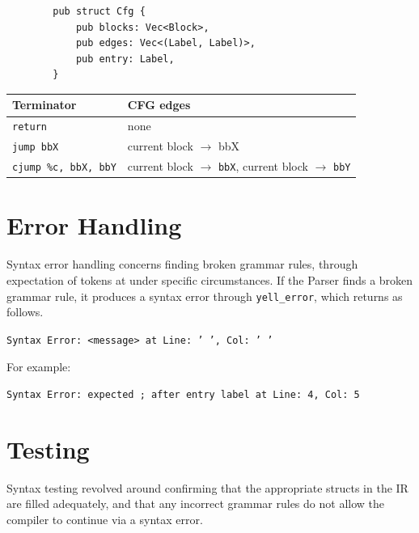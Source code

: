 \documentclass[11pt,a4paper,oneside]{report}
\begin{document}
	\begin{lstlisting}
		pub struct Cfg {
			pub blocks: Vec<Block>,
			pub edges: Vec<(Label, Label)>,
			pub entry: Label,
		}
	\end{lstlisting}
	
	\begin{center}
		\begin{tabular}{ll}
			\toprule
			Terminator & CFG edges \\
			\midrule
			\texttt{return} & none \\
			\texttt{jump bbX} & current block $\rightarrow$ bbX \\
			\texttt{cjump \%c, bbX, bbY} & current block $\rightarrow$ \texttt{bbX}, current block $\rightarrow$ \texttt{bbY} \\
			\bottomrule
		\end{tabular}
	\end{center}
	\newpage
	
	\section{Error Handling}
	Syntax error handling concerns finding broken grammar rules, through expectation of tokens at under specific circumstances. If the Parser finds a broken grammar rule, it produces a syntax error through \texttt{yell\_error}, which returns as follows.
	
	\begin{center}
		\texttt{Syntax Error: <message> at Line: ' ', Col: ' '}
	\end{center}
	
	For example:
	
	\begin{center}
		\texttt{Syntax Error: expected ; after entry label at Line: 4, Col: 5}
	\end{center}
	
	\section{Testing}
	
	\begin{testbox}
		Syntax testing revolved around confirming that the appropriate structs in the IR are filled adequately, and that any incorrect grammar rules do not allow the compiler to continue via a syntax error.  
	\end{testbox}
	
\end{document}
